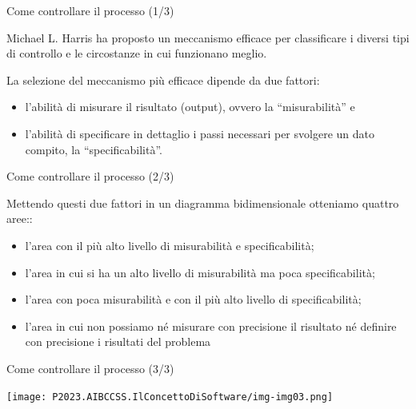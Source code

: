 \documentclass{beamer}
\begin{document}
\begin{frame}{\centerline{Come controllare il processo (1/3)}}


Michael L. Harris ha proposto un meccanismo efficace per classificare i diversi tipi di controllo e le circostanze in cui funzionano meglio.
\newline 

La selezione del meccanismo pi\`{u} efficace dipende da due fattori:
\begin{itemize}
\item  l'abilit\`{a} di misurare il risultato (output), ovvero la ``misurabilit\`{a}'' e

\item  l'abilit\`{a} di specificare in dettaglio i passi necessari per svolgere un dato compito, la ``specificabilit\`{a}''.
\end{itemize}
\end{frame}

\begin{frame}{\centerline{Come controllare il processo (2/3)}}

Mettendo questi due fattori in un diagramma bidimensionale otteniamo quattro aree::
\begin{itemize}

\item  l'area con il pi\`{u} alto livello di misurabilit\`{a} e specificabilit\`{a};

\item  l'area in cui si ha un alto livello di misurabilit\`{a} ma poca specificabilit\`{a};

\item  l'area con poca misurabilit\`{a} e con il pi\`{u} alto livello di specificabilit\`{a};

\item  l'area in cui non possiamo n\'{e} misurare con precisione il risultato n\'{e} definire con precisione i risultati del problema 

\end{itemize}
\end{frame}

\begin{frame}{\centerline{Come controllare il processo (3/3)}}


\begin{center}
\texttt{[image: P2023.AIBCCSS.IlConcettoDiSoftware/img-img03.png]}
\end{center}
\end{frame}
\end{document}
